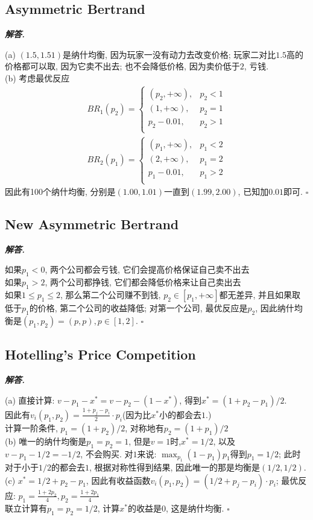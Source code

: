 \documentclass[10pt, a4paper, oneside]{ctexart}
\newenvironment{solution}{%
  \par\noindent\textbf{\textit{解答. }}\ignorespaces
}{%
  \hfill\ensuremath{\square}\par %
}
\begin{document}
\subsection{Asymmetric Bertrand}
\begin{solution}
(a) $(1.5,1.51)$是纳什均衡, 因为玩家一没有动力去改变价格; 玩家二对比$1.5$高的价格都可以取, 因为它卖不出去; 也不会降低价格, 因为卖价低于$2$, 亏钱.\\
(b) 考虑最优反应
\begin{align*} 
BR_1(p_2)=\begin{cases}
    (p_2,+\infty), &p_2<1\\
    (1,+\infty), &p_2=1\\
    p_2-0.01, &p_2>1\\
\end{cases}
\end{align*}
\begin{align*}
    BR_2(p_1)=\begin{cases}
        (p_1,+\infty), &p_1<2\\
        (2,+\infty), &p_1=2\\
        p_1-0.01, &p_1>2\\
    \end{cases}
    \end{align*}
因此有100个纳什均衡, 分别是$(1.00,1.01)$一直到$(1.99,2.00)$, 已知加$0.01$即可.
\end{solution}

\subsection{New Asymmetric Bertrand}
\begin{solution}
如果$p_1<0$, 两个公司都会亏钱, 它们会提高价格保证自己卖不出去\\
如果$p_1>2$, 两个公司都挣钱, 它们都会降低价格来让自己卖出去\\
如果$1\leq p_1\leq 2$, 那么第二个公司赚不到钱, $p_2\in[p_1,+\infty]$都无差异, 并且如果取低于$p_1$的价格, 第二个公司的收益降低; 对第一个公司, 最优反应是$p_2$, 因此纳什均衡是$(p_1,p_2)=(p,p), p\in[1,2]$.
\end{solution}

\subsection{Hotelling's Price Competition}
\begin{solution}
(a) 直接计算: $v-p_1-x^*=v-p_2-(1-x^*)$, 得到$x^*=(1+p_2-p_1)/2$.\\
因此有$v_i(p_1,p_2)=\frac{1+p_j-p_i}{2}\cdot p_i$(因为比$x^*$小的都会去$1$.)\\
计算一阶条件, $p_1=(1+p_2)/2$, 对称地有$p_2=(1+p_1)/2$\\
(b) 唯一的纳什均衡是$p_1=p_2=1$, 但是$v=1$时,$x^*=1/2$, 以及$v-p_1-1/2=-1/2$, 不会购买. 对$1$来说: $\max_{p_1}(1-p_1)p_1$得到$p_1=1/2$; 此时对于小于$1/2$的都会去$1$, 根据对称性得到结果, 因此唯一的那是均衡是$(1/2,1/2)$.\\
(c) $x^*=1/2+p_2-p_1$, 因此有收益函数$v_i(p_1,p_2)=(1/2+p_j-p_i)\cdot p_i$; 最优反应: $p_1=\frac{1+2p_2}{4}, p_2=\frac{1+2p_1}{4}$\\
联立计算有$p_1=p_2=1/2$, 计算$x^*$的收益是$0$, 这是纳什均衡.
\end{solution}
\end{document}
